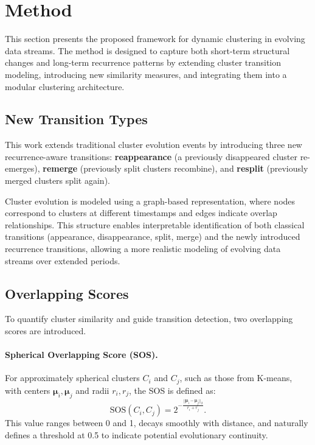 \section{Method}\label{method}

This section presents the proposed framework for dynamic clustering in evolving
data streams. The method is designed to capture both short-term structural
changes and long-term recurrence patterns by extending cluster transition
modeling, introducing new similarity measures, and integrating them into a
modular clustering architecture.

\subsection{New Transition Types}
This work extends traditional cluster evolution events by introducing three new
recurrence-aware transitions: \textbf{reappearance} (a previously disappeared
cluster re-emerges), \textbf{remerge} (previously split clusters recombine),
and \textbf{resplit} (previously merged clusters split again).

Cluster evolution is modeled using a graph-based representation, where nodes
correspond to clusters at different timestamps and edges indicate overlap
relationships. This structure enables interpretable identification of both
classical transitions (appearance, disappearance, split, merge) and the newly
introduced recurrence transitions, allowing a more realistic modeling of
evolving data streams over extended periods.

\subsection{Overlapping Scores}
To quantify cluster similarity and guide transition detection, two overlapping
scores are introduced.

\paragraph{Spherical Overlapping Score (SOS).}
For approximately spherical clusters $C_i$ and $C_j$, such as those from
K-means, with centers $\boldsymbol{\mu}_i, \boldsymbol{\mu}_j$ and radii $r_i,
    r_j$, the SOS is defined as:
\[
    \text{SOS}(C_i, C_j) = 2^{- \frac{||\boldsymbol{\mu}_i - \boldsymbol{\mu}_j||_2}{r_i + r_j}}.
\]
This value ranges between 0 and 1, decays smoothly with distance, and naturally
defines a threshold at 0.5 to indicate potential evolutionary continuity.

